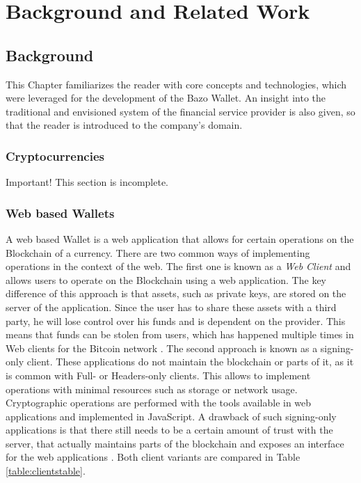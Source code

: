 \chapter{Background and Related Work}
\section{Background}
This Chapter familiarizes the reader with core concepts and technologies, which were leveraged for the development of the Bazo Wallet. An insight into the traditional and envisioned system of the financial service provider is also given, so that the reader is introduced to the company's domain.
\subsection{Cryptocurrencies}
\begin{bclogo}[logo=\bcattention, couleurBarre=red, noborder=true, 
               couleur=LightSalmon]{Important!}
This section is incomplete.
\end{bclogo}
\subsection{Web based Wallets}
A web based Wallet is a web application that allows for certain operations on the Blockchain of a currency. There are two common ways of implementing operations in the context of the web.
The first one is known as a \textit{Web Client} and allows users to operate on the Blockchain using a web application. The key difference of this approach is that assets, such as private keys, are stored on the server of the application. Since the user has to share these assets with a third party, he will lose control over his funds and is dependent on the provider. This means that funds can be stolen from users, which has happened multiple times in Web clients for the Bitcoin network \cite{masteringbitcoin}.
The second approach is known as a signing-only client. These applications do not maintain the blockchain or parts of it, as it is common with Full- or Headers-only clients. This allows to implement operations with minimal resources such as storage or network usage. Cryptographic operations are performed with the tools available in web applications and implemented in JavaScript.
A drawback of such signing-only applications is that there still needs to be a certain amount of trust with the server, that actually maintains parts of the blockchain and exposes an interface for the web applications \cite{bitcoinclients}.
Both client variants are compared in Table \ref{table:clientstable}.

